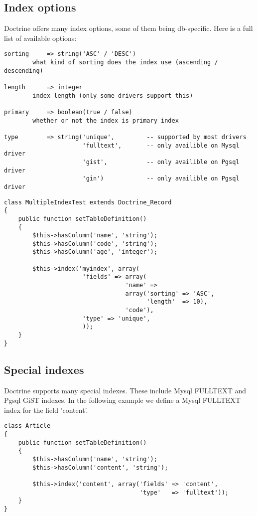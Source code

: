 \documentclass[11pt,a4paper]{report}
\begin{document}
\subsection{Index options}
Doctrine offers many index options, some of them being db-specific. Here is a full list of available options:

\begin{verbatim}
sorting     => string('ASC' / 'DESC')
        what kind of sorting does the index use (ascending / descending)

length      => integer
        index length (only some drivers support this)

primary     => boolean(true / false)
        whether or not the index is primary index

type        => string('unique',         -- supported by most drivers
                      'fulltext',       -- only availible on Mysql driver
                      'gist',           -- only availible on Pgsql driver
                      'gin')            -- only availible on Pgsql driver
\end{verbatim}

\begin{verbatim}
class MultipleIndexTest extends Doctrine_Record
{
    public function setTableDefinition()
    {
        $this->hasColumn('name', 'string');
        $this->hasColumn('code', 'string');
        $this->hasColumn('age', 'integer');

        $this->index('myindex', array(
                      'fields' => array(
                                  'name' =>
                                  array('sorting' => 'ASC',
                                        'length'  => 10),
                                  'code'),
                      'type' => 'unique',
                      ));
    }
}
\end{verbatim}

\subsection{Special indexes}
Doctrine supports many special indexes. These include Mysql FULLTEXT and Pgsql GiST indexes. In the following example we define a Mysql FULLTEXT index for the field 'content'.

\begin{verbatim}
class Article
{
    public function setTableDefinition()
    {
        $this->hasColumn('name', 'string');
        $this->hasColumn('content', 'string');

        $this->index('content', array('fields' => 'content',
                                      'type'   => 'fulltext'));
    }
}
\end{verbatim}
\end{document}
